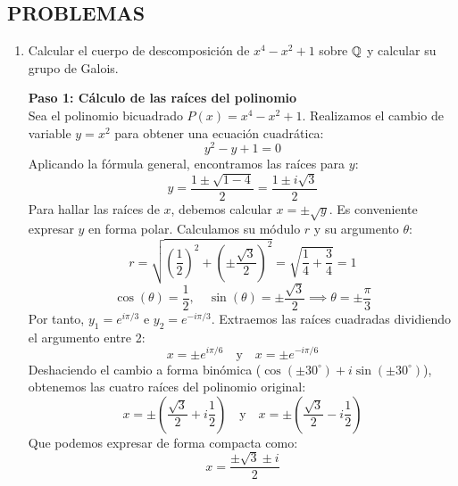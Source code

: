 \subsection*{PROBLEMAS}
\begin{enumerate}
    \item Calcular el cuerpo de descomposici\'on de $x^4 - x^2 + 1$ sobre $\mathbb{Q}$ y calcular su grupo de Galois.
    \begin{dem}\textbf{Paso 1: Cálculo de las raíces del polinomio} \\
Sea el polinomio bicuadrado $P(x) = x^4 - x^2 + 1$. Realizamos el cambio de variable $y = x^2$ para obtener una ecuación cuadrática:
$$ y^2 - y + 1 = 0 $$
Aplicando la fórmula general, encontramos las raíces para $y$:
$$ y = \frac{1 \pm \sqrt{1 - 4}}{2} = \frac{1 \pm i\sqrt{3}}{2} $$
Para hallar las raíces de $x$, debemos calcular $x = \pm\sqrt{y}$. Es conveniente expresar $y$ en forma polar. Calculamos su módulo $r$ y su argumento $\theta$:
$$ r = \sqrt{\left(\frac{1}{2}\right)^2 + \left(\pm\frac{\sqrt{3}}{2}\right)^2} = \sqrt{\frac{1}{4} + \frac{3}{4}} = 1 $$
$$ \cos(\theta) = \frac{1}{2}, \quad \sin(\theta) = \pm\frac{\sqrt{3}}{2} \implies \theta = \pm \frac{\pi}{3} $$
Por tanto, $y_1 = e^{i\pi/3}$ e $y_2 = e^{-i\pi/3}$. Extraemos las raíces cuadradas dividiendo el argumento entre 2:
$$ x = \pm e^{i\pi/6} \quad \text{y} \quad x = \pm e^{-i\pi/6} $$
Deshaciendo el cambio a forma binómica ($\cos(\pm 30^\circ) + i\sin(\pm 30^\circ)$), obtenemos las cuatro raíces del polinomio original:
$$ x = \pm\left(\frac{\sqrt{3}}{2} + i\frac{1}{2}\right) \quad \text{y} \quad x = \pm\left(\frac{\sqrt{3}}{2} - i\frac{1}{2}\right) $$
Que podemos expresar de forma compacta como:
$$ x = \frac{\pm\sqrt{3} \pm i}{2} $$


\end{dem}
\end{enumerate}

